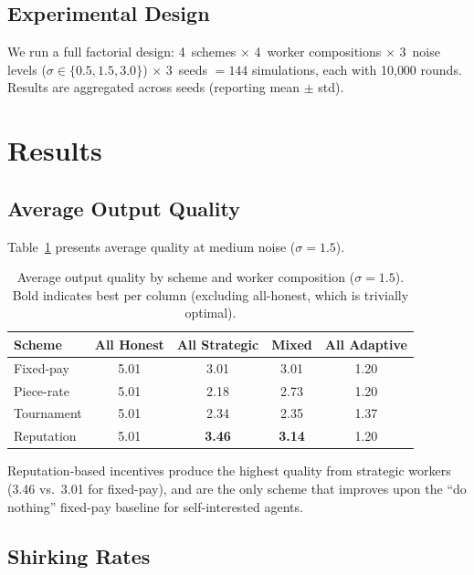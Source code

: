 \documentclass[11pt]{article}
\begin{document}
\subsection{Experimental Design}

We run a full factorial design: 4~schemes $\times$ 4~worker compositions $\times$ 3~noise levels ($\sigma \in \{0.5, 1.5, 3.0\}$) $\times$ 3~seeds $= 144$ simulations, each with 10{,}000 rounds.
Results are aggregated across seeds (reporting mean $\pm$ std).

\section{Results}

\subsection{Average Output Quality}

Table~\ref{tab:quality} presents average quality at medium noise ($\sigma = 1.5$).

\begin{table}[h]
\centering
\small
\caption{Average output quality by scheme and worker composition ($\sigma = 1.5$). Bold indicates best per column (excluding all-honest, which is trivially optimal).}
\label{tab:quality}
\begin{tabular}{lcccc}
\toprule
\textbf{Scheme} & \textbf{All Honest} & \textbf{All Strategic} & \textbf{Mixed} & \textbf{All Adaptive} \\
\midrule
Fixed-pay    & 5.01 & 3.01 & 3.01 & 1.20 \\
Piece-rate   & 5.01 & 2.18 & 2.73 & 1.20 \\
Tournament   & 5.01 & 2.34 & 2.35 & 1.37 \\
Reputation   & 5.01 & \textbf{3.46} & \textbf{3.14} & 1.20 \\
\bottomrule
\end{tabular}
\end{table}

Reputation-based incentives produce the highest quality from strategic workers (3.46 vs.\ 3.01 for fixed-pay), and are the only scheme that improves upon the ``do nothing'' fixed-pay baseline for self-interested agents.

\subsection{Shirking Rates}
\end{document}
